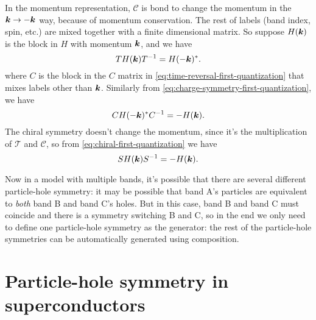 \documentclass[hyperref, a4paper]{article}
\begin{document}
In the momentum representation, $\mathcal{C}$ is bond to change the momentum in the $\vb*{k} \to - \vb*{k}$ 
way, because of momentum conservation. The rest of labels (band index, spin, etc.) are mixed together with a finite dimensional matrix.
So suppose $H(\vb*{k})$ is the block in $H$ with momentum $\vb*{k}$, and we have 
\begin{equation}
    T H(\vb*{k}) T^{-1} = H(- \vb*{k})^*.
\end{equation}
where $C$ is the block in the $C$ matrix in \eqref{eq:time-reversal-first-quantization} that mixes labels other than $\vb*{k}$.
Similarly from \eqref{eq:charge-symmetry-first-quantization}, we have 
\begin{equation}
    C H(- \vb*{k})^* C^{-1} = - H(\vb*{k}).
\end{equation}
The chiral symmetry doesn't change the momentum, since it's the multiplication of $\mathcal{T}$ and $\mathcal{C}$,
so from \eqref{eq:chiral-first-quantization} we have 
\begin{equation}
    S H(\vb*{k}) S^{-1} =  - H(\vb*{k}).
\end{equation}

Now in a model with multiple bands, it's possible that 
there are several different particle-hole symmetry: it may be possible that band A's particles are equivalent 
to \emph{both} band B and band C's holes. But in this case, band B and band C must coincide and there is 
a symmetry switching B and C, so in the end we only need to define one particle-hole symmetry as the generator:
the rest of the particle-hole symmetries can be automatically generated using composition.

\section{Particle-hole symmetry in superconductors}
\end{document}
